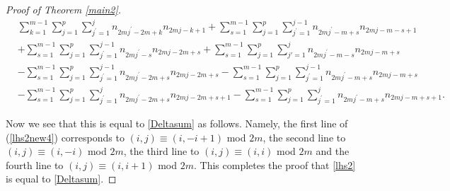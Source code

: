\documentclass[11pt,reqno]{amsart}
\theoremstyle{definition}
\numberwithin{equation}{section}
\begin{document}
\begin{proof}[Proof of Theorem \ref{main2}]
\begin{equation} \label{lhs2new4}
\begin{aligned}
& \sum_{k=1}^{m-1} \sum_{j=1}^{p} \sum_{j^{\prime}=1}^{j} n_{2mj^{\prime} - 2m + k}n_{2mj-k+1} + \sum_{s=1}^{m-1} \sum_{j=1}^{p} \sum_{j^{\prime}=1}^{j-1} n_{2mj^{\prime} - m+s}n_{2mj - m - s +1} \\
& + \sum_{s=1}^{m-1} \sum_{j=1}^{p}  \sum_{j^{\prime}=1}^{j-1} n_{2mj^{\prime} - s}n_{2mj-2m+s} + \sum_{s=1}^{m-1} \sum_{j=1}^{p} \sum_{j'=1}^{j} n_{2mj^{\prime} - m - s}n_{2mj-m+s} \\
& - \sum_{s=1}^{m-1} \sum_{j=1}^{p} \sum_{j^{\prime}=1}^{j-1} n_{2mj^{\prime} - 2m + s}n_{2mj-2m+s} - \sum_{s=1}^{m-1} \sum_{j=1}^{p} \sum_{j^{\prime}=1}^{j-1} n_{2mj^{\prime} - m + s}n_{2mj-m+s} \\
& - \sum_{s=1}^{m-1} \sum_{j=1}^{p}   \sum_{j^{\prime}=1}^{j} n_{2mj^{\prime}-2m+s} n_{2mj - 2m + s + 1}  - \sum_{s=1}^{m-1} \sum_{j=1}^{p}  \sum_{j^{\prime}=1}^{j} n_{2mj^{\prime}-m+s} n_{2mj - m + s + 1} .
\end{aligned}
\end{equation}

Now we see that this is equal to \eqref{Deltasum} as follows. Namely, the first line of (\ref{lhs2new4}) corresponds to $(i,j) \equiv (i,-i+1)$ mod $2m$, the second line to $(i,j) \equiv (i,-i)$ mod $2m$, the third line to $(i,j) \equiv (i,i)$ mod $2m$ and the fourth line to $(i,j) \equiv (i,i+1)$ mod $2m$. This completes the proof that \eqref{lhs2} is equal to \eqref{Deltasum}.
\end{proof}
\end{document}
